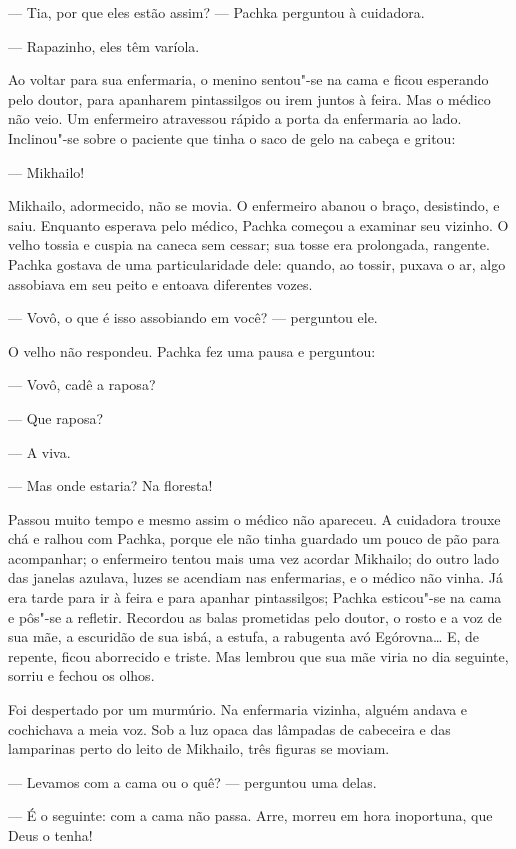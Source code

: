 --- Tia, por que eles estão assim? --- Pachka perguntou à cuidadora.

--- Rapazinho, eles têm varíola.

Ao voltar para sua enfermaria, o menino sentou"-se na cama e ficou
esperando pelo doutor, para apanharem pintassilgos ou irem juntos à
feira. Mas o médico não veio. Um enfermeiro atravessou rápido a porta da
enfermaria ao lado. Inclinou"-se sobre o paciente que tinha o saco de
gelo na cabeça e gritou:

--- Mikhailo!

Mikhailo, adormecido, não se movia. O enfermeiro abanou o braço,
desistindo, e saiu. Enquanto esperava pelo médico, Pachka começou a
examinar seu vizinho. O velho tossia e cuspia na caneca sem cessar; sua
tosse era prolongada, rangente. Pachka gostava de uma particularidade
dele: quando, ao tossir, puxava o ar, algo assobiava em seu peito e
entoava diferentes vozes.

--- Vovô, o que é isso assobiando em você? --- perguntou ele.

O velho não respondeu. Pachka fez uma pausa e perguntou:

--- Vovô, cadê a raposa?

--- Que raposa?

--- A viva.

--- Mas onde estaria? Na floresta!

Passou muito tempo e mesmo assim o médico não apareceu. A cuidadora
trouxe chá e ralhou com Pachka, porque ele não tinha guardado um pouco
de pão para acompanhar; o enfermeiro tentou mais uma vez acordar
Mikhailo; do outro lado das janelas azulava, luzes se acendiam nas
enfermarias, e o médico não vinha. Já era tarde para ir à feira e para
apanhar pintassilgos; Pachka esticou"-se na cama e pôs"-se a refletir.
Recordou as balas prometidas pelo doutor, o rosto e a voz de sua mãe, a
escuridão de sua isbá, a estufa, a rabugenta avó Egórovna\ldots{} E, de
repente, ficou aborrecido e triste. Mas lembrou que sua mãe viria no dia
seguinte, sorriu e fechou os olhos.

Foi despertado por um murmúrio. Na enfermaria vizinha, alguém andava e
cochichava a meia voz. Sob a luz opaca das lâmpadas de cabeceira e das
lamparinas perto do leito de Mikhailo, três figuras se moviam.

--- Levamos com a cama ou o quê? --- perguntou uma delas.

--- É o seguinte: com a cama não passa. Arre, morreu em hora inoportuna,
que Deus o tenha!

